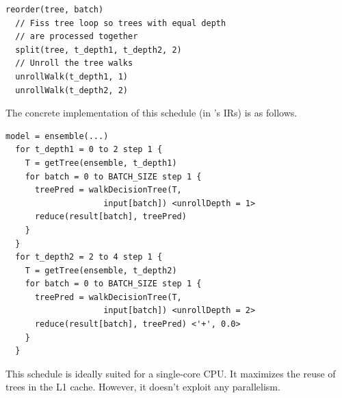 \begin{lstlisting}[style=c++]
  reorder(tree, batch)
  // Fiss tree loop so trees with equal depth 
  // are processed together  
  split(tree, t_depth1, t_depth2, 2)
  // Unroll the tree walks
  unrollWalk(t_depth1, 1)
  unrollWalk(t_depth2, 2)
\end{lstlisting}
The concrete implementation of this schedule (in \Treebeard{}'s IRs) 
is as follows.
\begin{lstlisting}[style=c++]
  model = ensemble(...)
  for t_depth1 = 0 to 2 step 1 {
    T = getTree(ensemble, t_depth1)
    for batch = 0 to BATCH_SIZE step 1 {
      treePred = walkDecisionTree(T, 
                    input[batch]) <unrollDepth = 1>
      reduce(result[batch], treePred)
    }
  }
  for t_depth2 = 2 to 4 step 1 {
    T = getTree(ensemble, t_depth2)
    for batch = 0 to BATCH_SIZE step 1 {
      treePred = walkDecisionTree(T,
                    input[batch]) <unrollDepth = 2>
      reduce(result[batch], treePred) <'+', 0.0>
    }
  }
\end{lstlisting}
This schedule is ideally suited for a single-core CPU. It maximizes 
the reuse of trees in the L1 cache. However, it doesn't exploit  
any parallelism. 

